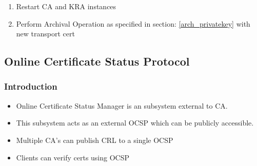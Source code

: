 \documentclass[12pt]{report}
\begin{document}
\begin{enumerate}[label*=\arabic*.]
\begin{enumerate}[label*=\arabic*.]
\begin{enumerate}[label*=\arabic*.]
\begin{enumerate}[label*=\arabic*.]
                                \item Restart CA and KRA instances
                                \item Perform Archival Operation as specified in section: \ref{arch_privatekey} with new transport cert
                            \end{enumerate}
                    \end{enumerate}
            \end{enumerate}
    \end{enumerate}
\subsection{Online Certificate Status Protocol}
\subsubsection{Introduction}
    \begin{itemize}
        \item Online Certificate Status Manager is an subsystem external to CA.
        \item This subsystem acts as an external OCSP which can be publicly accessible.
        \item Multiple CA's can publish CRL to a single OCSP 
        \item Clients can verify certs using OCSP 
    \end{itemize}
\end{document}
